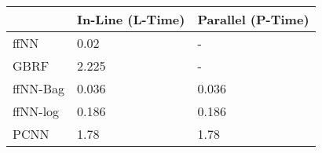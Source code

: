 \begin{tabular}{lll}
\toprule
{} & In-Line (L-Time) & Parallel (P-Time) \\
\midrule
ffNN     &             0.02 &                 - \\
GBRF     &            2.225 &                 - \\
ffNN-Bag &            0.036 &             0.036 \\
ffNN-log &            0.186 &             0.186 \\
PCNN     &             1.78 &              1.78 \\
\bottomrule
\end{tabular}

